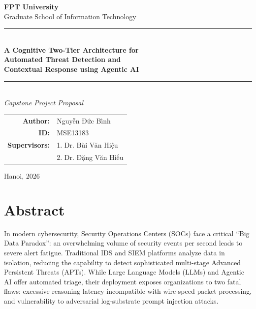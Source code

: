 \documentclass[12pt,a4paper]{article}
\begin{document}
\begin{titlepage}
    \centering

    \vspace*{1cm}
    {\large\textbf{FPT University}}\\[0.5cm]
    {\normalsize Graduate School of Information Technology}\\[2cm]

    \rule{\textwidth}{0.5pt}\\[0.5cm]
    {\LARGE\textbf{A Cognitive Two-Tier Architecture for\\Automated Threat Detection and\\Contextual Response using Agentic AI}}\\[0.5cm]
    \rule{\textwidth}{0.5pt}\\[1cm]

    {\large\textit{Capstone Project Proposal}}\\[2cm]

    \begin{tabular}{rl}
        \textbf{Author:}     & Nguyễn Đức Bình \\
        \textbf{ID:}         & MSE13183        \\[0.5cm]
        \textbf{Supervisors:} & 1. Dr. Bùi Văn Hiệu   \\
                              & 2. Dr. Đặng Văn Hiếu  \\
    \end{tabular}

    \vfill
    {\normalsize Hanoi, 2026}

\end{titlepage}

\newpage
{}
\section*{Abstract}
In modern cybersecurity, Security Operations Centers (SOCs) face a critical ``Big Data Paradox'': an overwhelming volume of security events per second leads to severe alert fatigue. Traditional IDS and SIEM platforms analyze data in isolation, reducing the capability to detect sophisticated multi-stage Advanced Persistent Threats (APTs). While Large Language Models (LLMs) and Agentic AI offer automated triage, their deployment exposes organizations to two fatal flaws: excessive reasoning latency incompatible with wire-speed packet processing, and vulnerability to adversarial log-substrate prompt injection attacks.
\end{document}
